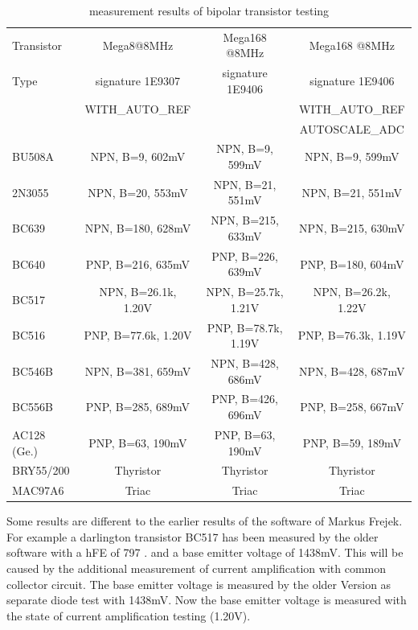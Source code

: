 \begin{table}[H]
  \begin{center}
    \begin{tabular}{| l | c | c | c |}
    \hline
     Transistor & Mega8@8MHz & Mega168 @8MHz & Mega168 @8MHz \\
     Type   & signature 1E9307 & signature 1E9406 & signature 1E9406 \\
           & WITH\_AUTO\_REF &  & WITH\_AUTO\_REF \\
           &                 &  & AUTOSCALE\_ADC \\
    \hline
    \hline
BU508A      & NPN, B=9, 602mV     & NPN, B=9, 599mV     & NPN, B=9, 599mV   \\
    \hline
2N3055      & NPN, B=20, 553mV    & NPN, B=21, 551mV    & NPN, B=21, 551mV  \\
    \hline
BC639       & NPN, B=180, 628mV   & NPN, B=215, 633mV   & NPN, B=215, 630mV \\
    \hline
BC640       & PNP, B=216, 635mV   & PNP, B=226, 639mV   & PNP, B=180, 604mV \\
    \hline
BC517       & NPN, B=26.1k, 1.20V & NPN, B=25.7k, 1.21V & NPN, B=26.2k, 1.22V\\
    \hline
BC516       & PNP, B=77.6k, 1.20V & PNP, B=78.7k, 1.19V & PNP, B=76.3k, 1.19V\\
    \hline
BC546B      & NPN, B=381, 659mV   & NPN, B=428, 686mV   & NPN, B=428, 687mV \\
    \hline
BC556B      & PNP, B=285, 689mV   & PNP, B=426, 696mV   & PNP, B=258, 667mV \\
    \hline
AC128 (Ge.) & PNP, B=63, 190mV    & PNP, B=63, 190mV    & PNP, B=59, 189mV  \\
    \hline
BRY55/200   & Thyristor           & Thyristor           & Thyristor        \\
    \hline
MAC97A6     & Triac               & Triac               & Triac        \\
    \hline
    \end{tabular}
  \end{center}
  \caption{measurement results of bipolar transistor testing}
  \label{tab:bipolar} 
\end{table}

Some results are different to the earlier results of the software of Markus Frejek.
For example a darlington transistor BC517 has been measured by the older software
with a hFE of 797 .
and a base emitter voltage of 1438mV.
This will be caused by the additional measurement of current amplification with common collector circuit.
The base emitter voltage is measured by the older Version as separate diode test with 1438mV.
Now the base emitter voltage is measured with the state of current amplification testing (1.20V).


